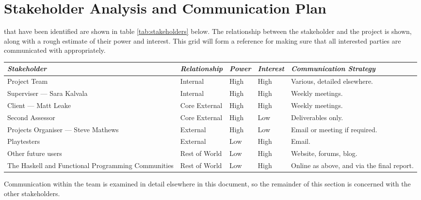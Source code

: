 \chapter[Stakeholder Analysis and Communication Plan]{Stakeholder Analysis and Communication Plan}
\label{ch:communication}

 that have been identified are shown in table \ref{tab:stakeholders} below. The relationship between the stakeholder and the project is shown, along with a rough estimate of their power and interest. This grid will form a reference for making sure that all interested parties are communicated with appropriately.

\vspace{1em}

\begin{table*}
	\small
	\renewcommand{\arraystretch}{1.2}
	\begin{tabular}{p{20em} p{7em} p{3em} p{3em} p{13em}}
		\toprule
		\emph{Stakeholder} & \emph{Relationship} & \emph{Power} & \emph{Interest} & \emph{Communication Strategy} \\
		\midrule
		
		Project Team & Internal & High & High & 
		 Various, detailed elsewhere. \\
		Superviser --- Sara Kalvala & Internal & High & High &
		 Weekly meetings. \\
		Client --- Matt Leake & Core External & High & High &
		 Weekly meetings. \\
		Second Assessor & Core External & High & Low &
		 Deliverables only. \\
		Projects Organiser --- Steve Mathews & External &
		 High & Low & Email or meeting if required. \\
		Playtesters & External & Low & High & Email. \\
		Other future users & Rest of World & Low &
		 High & Website, forums, blog. \\
		The Haskell and Functional Programming Communities & Rest of World & Low &
		 High & Online as above, and via the final report. \\
		\bottomrule
	\end{tabular}
	\vspace{1.5em}
	\caption{Stakeholders for the project.}
	\label{tab:stakeholders}
\end{table*}

\noindent Communication within the team is examined in detail elsewhere in this document, so the remainder of this section is concerned with the other stakeholders.

